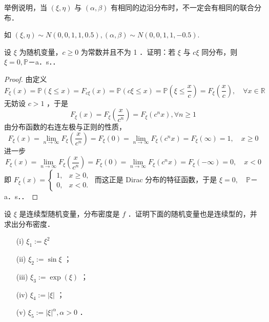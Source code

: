 \begin{exercise}
    举例说明，当 $(\xi, \eta)$ 与 $(\alpha, \beta)$ 有相同的边沿分布时，不一定会有相同的联合分布．
\end{exercise}
如 $(\xi, \eta) \sim N(0,0,1,1,0.5),(\alpha, \beta) \sim N(0,0,1,1,-0.5)$.
\begin{exercise}
    设 $\xi$ 为随机变量，$c \geq 0$ 为常数并且不为 1 ．证明：若 $\xi$ 与 $c \xi$ 同分布，则 $\xi=0, \mathbb{P}$－a．s．．
\end{exercise}
\begin{proof}
    由定义
    $$
        F_{\xi}(x)=\mathbb{P}(\xi \leq x)=F_{c \xi}(x)=\mathbb{P}(c \xi \leq x)=\mathbb{P}\left(\xi \leq \frac{x}{c}\right)=F_{\xi}\left(\frac{x}{c}\right), \quad \forall x \in \mathbb{R}
    $$
    无妨设 $c>1$ ，于是
    $$
        F_{\xi}(x)=F_{\xi}\left(\frac{x}{c^n}\right)=F_{\xi}\left(c^n x\right), \forall n \geq 1
    $$
    由分布函数的右连左极与正则的性质，
    $$
        F_{\xi}(x)=\lim _{n \rightarrow \infty} F_{\xi}\left(\frac{x}{c^n}\right)=F_{\xi}(0)=\lim _{n \rightarrow \infty} F_{\xi}\left(c^n x\right)=F_{\xi}(\infty)=1, \quad x \geq 0
    $$
    进一步
    $$
        F_{\xi}(x)=\lim _{n \rightarrow \infty} F_{\xi}\left(\frac{x}{c^n}\right)=F_{\xi}(0)=\lim _{n \rightarrow \infty} F_{\xi}\left(c^n x\right)=F_{\xi}(-\infty)=0, \quad x<0
    $$
    即 $F_{\xi}(x)=\left\{\begin{array}{ll}1, & x \geq 0, \\ 0, & x<0 .\end{array}\right.$ 而这正是 Dirac 分布的特征函数，于是 $\xi=0, \quad \mathbb{P}$－a．s．．
\end{proof}
\begin{exercise}
    设 $\xi$ 是连续型随机变量，分布密度是 $f$ ．证明下面的随机变量也是连续型的，并求出分布密度．
    \begin{enumerate}
        \item[(i)] $\xi_1:=\xi^2$
        \item[(ii)] $\xi_2:=\sin \xi$ ；
        \item[(iii)] $\xi_3:=\exp (\xi)$ ；
        \item[(iv)] $\xi_4:=|\xi|$ ；
        \item[(v)] $\xi_5:=|\xi|^\alpha, \alpha>0$ ．
    \end{enumerate}
\end{exercise}
